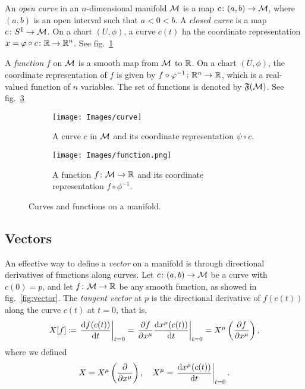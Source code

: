 \begin{definition}[Curve]
	An \emph{open curve} in an $n$-dimensional manifold $\mathcal{M}$ is a map $c \colon (a,b) \to \mathcal{M}$, where $(a,b)$ is an open interval such that $a<0<b$. A \emph{closed curve} is a map $c \colon S^1 \to \mathcal{M}$. On a chart $(U,\phi)$, a curve $c(t)$ ha the coordinate representation $x=\varphi \circ c \colon \mathbb{R} \to \mathbb{R}^n$. See fig.~\ref{fig:curve}
\end{definition}

\begin{definition}[Function]
	A \emph{function} $f$ on $\mathcal{M}$ is a smooth map from $\mathcal{M}$ to $\mathbb{R}$. On a chart $(U,\phi)$, the coordinate representation of $f$ is given by $f \circ \varphi^{-1} \colon \mathbb{R}^n \to \mathbb{R}$, which is a real-valued function of $n$ variables. The set of functions is denoted by $\mathfrak{F}(\mathcal{M})$. See fig.~\ref{fig:function}
\end{definition}

\begin{figure}
	\centering
	\begin{subfigure}[b]{0.38\textwidth}
		\texttt{[image: Images/curve]}
		\caption{A curve $c$ in $\mathcal{M}$ and its coordinate representation $\psi \circ c$.}
		\label{fig:curve}
	\end{subfigure}
	\hfill
	\begin{subfigure}[b]{0.42\textwidth}
		\texttt{[image: Images/function.png]}
		\caption{A function $f\colon \mathcal{M} \to \mathbb{R}$ and its coordinate representation $f \circ \phi^{-1}$.}
		\label{fig:function}
	\end{subfigure}
	\caption{Curves and functions on a manifold.}
\end{figure}

\subsection{Vectors}
An effective way to define a \emph{vector} on a manifold is through directional derivatives of functions along curves. Let $c\colon (a,b) \to \mathcal{M}$ be a curve with $c(0)=p$, and let $f \colon \mathcal{M} \to \mathbb{R}$ be any smooth function, as showed in fig.~\ref{fig:vector}. The \emph{tangent vector} at $p$ is the directional derivative of $f(c(t))$ along the curve $c(t)$ at $t=0$, that is,
\begin{equation}
	X[f] \coloneq \left. \frac{\mathop{}\!\mathrm{d} f (c(t))}{\mathop{}\!\mathrm{d} t}\right|_{t=0} = \left. \frac{\partial f}{\partial x^\mu} \frac{\mathop{}\!\mathrm{d} x^\mu(c(t))}{\mathop{}\!\mathrm{d} t} \right|_{t=0} = X^\mu \left(\frac{\partial f}{\partial x^\mu}\right),
\end{equation}
where we defined
\begin{equation}\label{eq:def-vectors}
	X = X^\mu \left(\frac{\partial}{\partial x^\mu}\right), \quad X^\mu = \left. \frac{\mathop{}\!\mathrm{d} x^\mu(c(t))}{\mathop{}\!\mathrm{d} t} \right|_{t=0} .
\end{equation}


